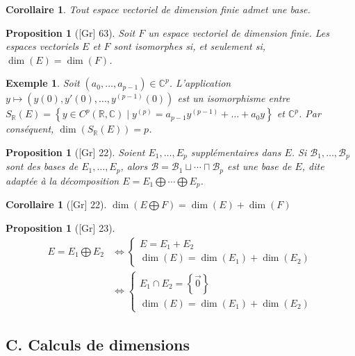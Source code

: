 \documentclass[10pt, a4paper, parskip=full, twoside, twocolumn]{report}
\newtheorem{proposition}[definition]{Proposition}
\newtheorem{corollary}[definition]{Corollaire}
\newtheorem{example}[definition]{Exemple}
\newcommand{\IC}{\mathbb{C}}
\newcommand{\IR}{\mathbb{R}}
\begin{document}
\begin{corollary}
	Tout espace vectoriel de dimension finie admet une base.
\end{corollary}

\begin{proposition}[\textnormal{[Gr] 63}]
	Soit $F$ un espace vectoriel de dimension finie. Les espaces
	vectoriels $E$ et $F$ sont isomorphes si, et seulement si, $\dim(E) = \dim(F)$.
\end{proposition}

\begin{example}
	Soit $(a_0,\dots, a_{p-1})\in \IC^p$.
	L'application $y \mapsto (y(0), y'(0), \dots, y^{(p-1)}(0))$
	est un isomorphisme entre $S_{\IR}(E) = \left\{y\in C^p(\IR,\IC) \mid y^{(p)} = a_{p-1}y^{(p-1)} + \dots + a_0y\right\}$
	et $\IC^p$. Par conséquent, $\dim(S_{\IR}(E)) = p$.
\end{example}

\begin{proposition}[\textnormal{[Gr] 22}]
	Soient $E_1,\dots,E_p$ supplémentaires dans $E$.
	Si $\mathcal{B}_1,\dots, \mathcal{B}_p$ sont des bases de $E_1,\dots, E_p$, alors $\mathcal{B} = \mathcal{B}_1 \sqcup \cdots \sqcap \mathcal{B}_p$
	est une base de $E$, dite \emph{adaptée à la décomposition $E = E_1\bigoplus \cdots \bigoplus E_p$}.
\end{proposition}

\begin{corollary}[\textnormal{[Gr] 22}]
	$\dim(E\bigoplus F) = \dim(E) + \dim(F)$
\end{corollary}

\begin{proposition}[\textnormal{[Gr] 23}]
	\begin{align*}
		E = E_1 \bigoplus E_2 &\iff \begin{cases}
			E = E_1 + E_2 \\ \dim(E) = \dim(E_1) + \dim(E_2)
		\end{cases}\\
		&\iff \begin{cases}
			E_1 \cap E_2 = \left\{\overrightarrow{0}\right\} \\ \dim(E) = \dim(E_1) + \dim(E_2)
		\end{cases}
	\end{align*}
\end{proposition}

\subsection*{C. Calculs de dimensions}
\end{document}
